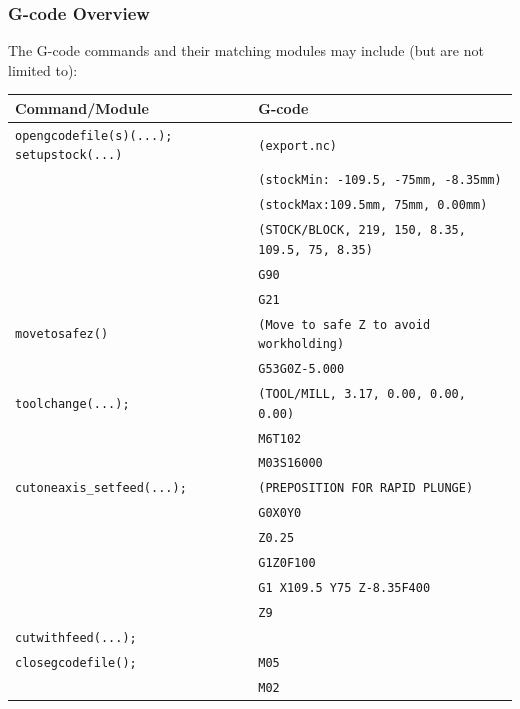 \documentclass{ltxdoc}
\begin{document}

\subsubsection{G-code Overview}
 
The G-code commands and their matching modules may include (but are not limited to):

\bigskip

\noindent \begin{tabular}{@{}ll@{}} \toprule
 Command/Module                    & G-code                                        \\ \midrule
 \texttt{opengcodefile(s)(...);}
 \texttt{setupstock(...)}          & \texttt{(export.nc)}                          \\
                                   & \texttt{(stockMin: -109.5, -75mm, -8.35mm)}\\
                                   & \texttt{(stockMax:109.5mm, 75mm, 0.00mm)}\\
                                   & \texttt{(STOCK/BLOCK, 219, 150, 8.35, 109.5, 75, 8.35)}\\
                                   & \texttt{G90}\\
                                   & \texttt{G21} \\ \midrule
 \texttt{movetosafez()}            & \texttt{(Move to safe Z to avoid workholding)}\\
                                   & \texttt{G53G0Z-5.000}\\ \midrule
 \texttt{toolchange(...);}         & \texttt{(TOOL/MILL, 3.17, 0.00, 0.00, 0.00)} \\
                                   & \texttt{M6T102} \\
                                   & \texttt{M03S16000} \\ \midrule
 \verb|cutoneaxis_setfeed(...);|   & \texttt{(PREPOSITION FOR RAPID PLUNGE)}\\
  & \texttt{G0X0Y0} \\
  & \texttt{Z0.25} \\
  & \texttt{G1Z0F100} \\
  & \texttt{G1 X109.5 Y75 Z-8.35F400} \\
  & \texttt{Z9}\\
 \texttt{cutwithfeed(...);}\\ \midrule

 \texttt{closegcodefile();}        & \texttt{M05}\\
                                   & \texttt{M02}\\ 
\bottomrule
\end{tabular}
\bigskip
\end{document}
